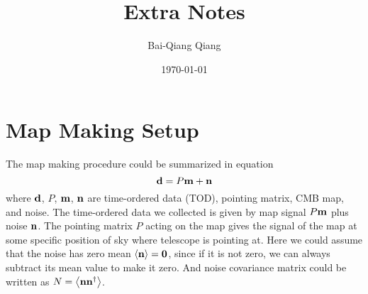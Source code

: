 \documentclass[11pt, letterpaper]{article}
\title{Extra Notes}
\author{Bai-Qiang Qiang}
\date{\today}
\newcommand{\vbd}{\vb{d}}
\newcommand{\vbm}{\vb{m}}
\newcommand{\vbn}{\vb{n}}
\begin{document}
\maketitle

%

\section{Map Making Setup}

The map making procedure could be summarized in equation
\begin{equation}
\vbd = P\vbm + \vbn \label{map making model}
\end{equation}
where $\vbd$, $P$, $\vbm$, $\vbn$ are time-ordered data (TOD), pointing matrix,
CMB map, and noise.
The time-ordered data we collected is given by map signal $P\vbm$ plus noise 
$\vbn$.
The pointing matrix $P$ acting on the map gives the signal of the map at some specific 
position of sky where telescope is pointing at.
Here we could assume that the noise has zero mean $\ev{\vbn} = \vb{0}$,
since if it is not zero, we can always subtract its mean value to make it zero.
And noise covariance matrix could be written as $N = \ev{\vbn \vbn^{\dagger}}$.
\end{document}
